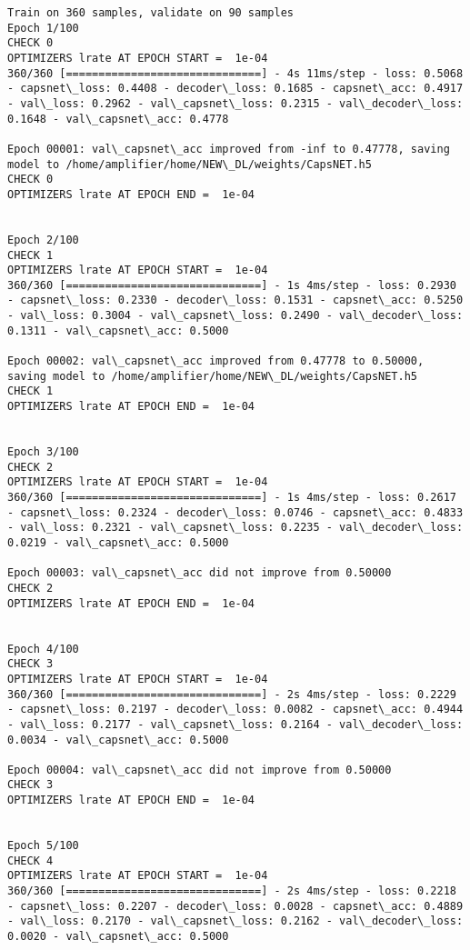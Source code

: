\documentclass[11pt]{article}
\begin{document}
    \begin{Verbatim}[commandchars=\\\{\}]
Train on 360 samples, validate on 90 samples
Epoch 1/100
CHECK 0
OPTIMIZERS lrate AT EPOCH START =  1e-04
360/360 [==============================] - 4s 11ms/step - loss: 0.5068 - capsnet\_loss: 0.4408 - decoder\_loss: 0.1685 - capsnet\_acc: 0.4917 - val\_loss: 0.2962 - val\_capsnet\_loss: 0.2315 - val\_decoder\_loss: 0.1648 - val\_capsnet\_acc: 0.4778

Epoch 00001: val\_capsnet\_acc improved from -inf to 0.47778, saving model to /home/amplifier/home/NEW\_DL/weights/CapsNET.h5
CHECK 0
OPTIMIZERS lrate AT EPOCH END =  1e-04 


Epoch 2/100
CHECK 1
OPTIMIZERS lrate AT EPOCH START =  1e-04
360/360 [==============================] - 1s 4ms/step - loss: 0.2930 - capsnet\_loss: 0.2330 - decoder\_loss: 0.1531 - capsnet\_acc: 0.5250 - val\_loss: 0.3004 - val\_capsnet\_loss: 0.2490 - val\_decoder\_loss: 0.1311 - val\_capsnet\_acc: 0.5000

Epoch 00002: val\_capsnet\_acc improved from 0.47778 to 0.50000, saving model to /home/amplifier/home/NEW\_DL/weights/CapsNET.h5
CHECK 1
OPTIMIZERS lrate AT EPOCH END =  1e-04 


Epoch 3/100
CHECK 2
OPTIMIZERS lrate AT EPOCH START =  1e-04
360/360 [==============================] - 1s 4ms/step - loss: 0.2617 - capsnet\_loss: 0.2324 - decoder\_loss: 0.0746 - capsnet\_acc: 0.4833 - val\_loss: 0.2321 - val\_capsnet\_loss: 0.2235 - val\_decoder\_loss: 0.0219 - val\_capsnet\_acc: 0.5000

Epoch 00003: val\_capsnet\_acc did not improve from 0.50000
CHECK 2
OPTIMIZERS lrate AT EPOCH END =  1e-04 


Epoch 4/100
CHECK 3
OPTIMIZERS lrate AT EPOCH START =  1e-04
360/360 [==============================] - 2s 4ms/step - loss: 0.2229 - capsnet\_loss: 0.2197 - decoder\_loss: 0.0082 - capsnet\_acc: 0.4944 - val\_loss: 0.2177 - val\_capsnet\_loss: 0.2164 - val\_decoder\_loss: 0.0034 - val\_capsnet\_acc: 0.5000

Epoch 00004: val\_capsnet\_acc did not improve from 0.50000
CHECK 3
OPTIMIZERS lrate AT EPOCH END =  1e-04 


Epoch 5/100
CHECK 4
OPTIMIZERS lrate AT EPOCH START =  1e-04
360/360 [==============================] - 2s 4ms/step - loss: 0.2218 - capsnet\_loss: 0.2207 - decoder\_loss: 0.0028 - capsnet\_acc: 0.4889 - val\_loss: 0.2170 - val\_capsnet\_loss: 0.2162 - val\_decoder\_loss: 0.0020 - val\_capsnet\_acc: 0.5000


\end{Verbatim}
\end{document}
